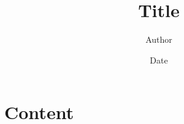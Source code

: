 \documentclass[a4paper,11pt]{scrartcl}
\title{Title}
\author{Author}
\date{Date}
\begin{document}
\maketitle
\tableofcontents

\newpage

\section{Content}

\newpage


\end{document}
